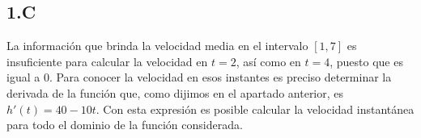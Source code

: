 \subsection*{1.C}

La información que brinda la velocidad media en el intervalo $[1, 7]$ es insuficiente para calcular la velocidad en $t=2$, así como en $t=4$, puesto que es igual a 0. Para conocer la velocidad en esos instantes es preciso determinar la derivada de la función que, como dijimos en el apartado anterior, es $h'(t)=40-10t$. Con esta expresión es posible calcular la velocidad instantánea para todo el dominio de la función considerada.